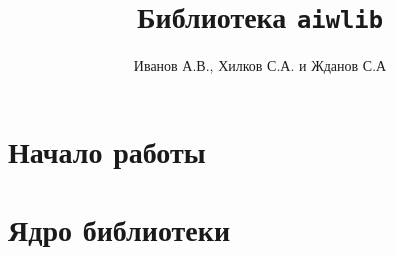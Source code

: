 \documentclass[12pt]{book}
\begin{document}
\title{Библиотека {\tt aiwlib}}
\author{
Иванов А.В., Хилков С.А. и Жданов С.А
}

\maketitle

\tableofcontents


\chapter{Начало работы} %
% 



\chapter{Ядро библиотеки}




























\end{document}
